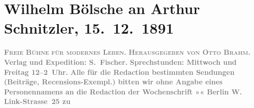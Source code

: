 

         
         \renewcommand{\erwaehntePersonen}{Personen: Otto Brahm, Wilhelm Bölsche}
         \renewcommand{\erwaehnteInstitutionen}{Institutionen: S. Fischer Verlag}
         \renewcommand{\erwaehnteOrte}{Orte: Berlin, Friedrichshagen, Linkstraße, Peter-Hille-Straße, Wien}
         \renewcommand{\erwaehnteWerke}{Werke: Der Sohn. Aus den Papieren eines Arztes, Freie Bühne für den Entwickelungskampf der Zeit, Freie Bühne für modernes Leben}
               \section[Wilhelm Bölsche an Arthur Schnitzler, 15. 12. 1891]{ Wilhelm Bölsche an Arthur Schnitzler, 15. 12. 1891}\nopagebreak{}\rehead{ }\begin{ledgroupsized}[t]{13cm}\normalsize\beginnumbering \toendnotes[C]{\smallbreak\pagebreak[2]} 
\toendnotes[C]{\smallbreak}\pstart
           \noindent{}\centering{}{\pb}\textcolor{gray}{\textbf{\textsc{Freie Bühne}}}\pend
           \pstart
           \noindent{}\centering{}\textcolor{gray}{\textbf{\textsc{für modernes Leben.}}}\pend
           \pstart
           \noindent{}\centering{}\textcolor{gray}{\textbf{\textsc{Herausgegeben von \textbf{Otto Brahm}.}}}\pend
           \pstart
           \noindent{}\textcolor{gray}{\textbf{Verlag und Expedition: S. Fischer.}}\pend
           \pstart
           \textcolor{gray}{\textbf{Sprechstunden: Mittwoch und Freitag 12–2 Uhr.}}\pend
           \pstart
           \textcolor{gray}{\textbf{Alle für die Redaction bestimmten Sendungen (Beiträge,
                     Recensions-Exempl.) bitten wir \textbf{ohne Angabe eines
                        Personennamens} an die Redaction der Wochenschrift »« Berlin W. Link-Strasse 25 zu
}}
\end{ledgroupsized}
